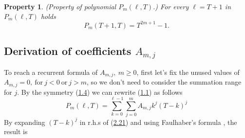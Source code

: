 \documentclass[11pt, letterpaper]{amsart} da da ya qq
\newtheorem{ppty}[thm]{Property}
\theoremstyle{definition}
\theoremstyle{remark}
\numberwithin{equation}{section}
\begin{document}
\begin{ppty} (Property of polynomial $P_m(\ell,T)$.)
For every $\ell=T+1$ in $P_m(\ell,T)$ holds
\begin{equation*}
P_m(T+1,T)=T^{2m+1}-1.
\end{equation*}
\end{ppty}
\subsection{Derivation of coefficients \texorpdfstring{$A_{m,j}$}{A(m,j)}}
To reach a recurrent formula of $A_{m,j}, \ m\geq0$, first let's fix the unused values of $A_{m,j}=0, \ \mathrm{for} \ j<0 \ \mathrm{or} \ j>m$, so we don't need to consider the summation range for $j$. By the symmetry (\hyperref[symmetry_2]{1.4}) we can rewrite (\hyperref[f1]{1.1}) as follows
\begin{equation}\label{gen_5_2}
P_m(\ell,T)=\sum_{k=0}^{\ell-1}\sum_{j=0}^m A_{m,j}k^j(T-k)^j
\end{equation}
By expanding $(T-k)^j$ in r.h.s of (\hyperref[gen_5_2]{2.21}) and using Faulhaber's formula \cite{11}, the result is
\end{document}
